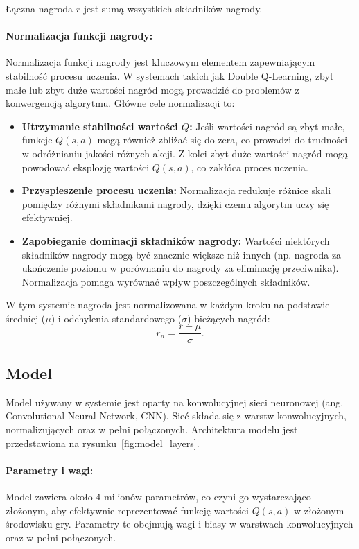 Łączna nagroda $r$ jest sumą wszystkich składników nagrody.
\paragraph{Normalizacja funkcji nagrody:}

Normalizacja funkcji nagrody jest kluczowym elementem zapewniającym stabilność procesu uczenia. W systemach takich jak Double Q-Learning, zbyt małe lub zbyt duże wartości nagród mogą prowadzić do problemów z konwergencją algorytmu. Główne cele normalizacji to:

\begin{itemize}
	\item \textbf{Utrzymanie stabilności wartości \(Q\):} Jeśli wartości nagród są zbyt małe, funkcje \(Q(s, a)\) mogą również zbliżać się do zera, co prowadzi do trudności w odróżnianiu jakości różnych akcji. Z kolei zbyt duże wartości nagród mogą powodować eksplozję wartości \(Q(s, a)\), co zakłóca proces uczenia.
	\item \textbf{Przyspieszenie procesu uczenia:} Normalizacja redukuje różnice skali pomiędzy różnymi składnikami nagrody, dzięki czemu algorytm uczy się efektywniej.
	\item \textbf{Zapobieganie dominacji składników nagrody:} Wartości niektórych składników nagrody mogą być znacznie większe niż innych (np. nagroda za ukończenie poziomu w porównaniu do nagrody za eliminację przeciwnika). Normalizacja pomaga wyrównać wpływ poszczególnych składników.
\end{itemize}

W tym systemie nagroda jest normalizowana w każdym kroku na podstawie średniej (\(\mu\)) i odchylenia standardowego (\(\sigma\)) bieżących nagród:
\[
	r_n = \frac{r - \mu}{\sigma}.
\]
\subsection{Model}

Model używany w systemie jest oparty na konwolucyjnej sieci neuronowej (ang. Convolutional Neural Network, CNN). Sieć składa się z warstw konwolucyjnych, normalizujących oraz w pełni połączonych. Architektura modelu jest przedstawiona na rysunku~\ref{fig:model_layers}.

\paragraph{Parametry i wagi:}
Model zawiera około 4 milionów parametrów, co czyni go wystarczająco złożonym, aby efektywnie reprezentować funkcję wartości \(Q(s, a)\) w złożonym środowisku gry. Parametry te obejmują wagi i biasy w warstwach konwolucyjnych oraz w pełni połączonych.

